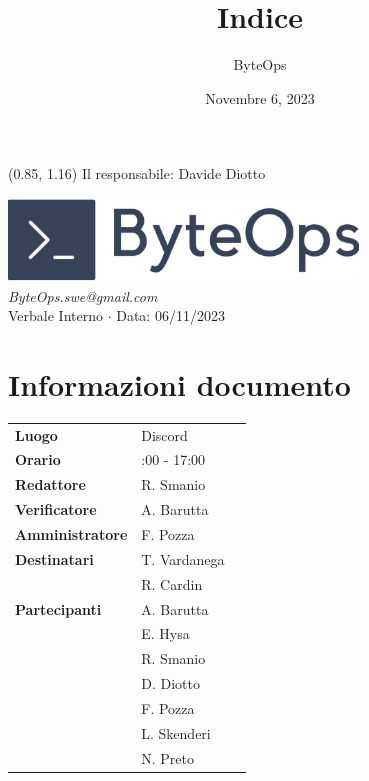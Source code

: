 \documentclass{article}
\title{\textbf{\fontsize{28}{6}\selectfont Indice}}
\author{\fontsize{14}{6}\selectfont ByteOps}
\date{Novembre 6, 2023}
\begin{document}
\begin{textblock*}{\textwidth}(0.85\textwidth, 1.16\textheight)
    Il responsabile: Davide Diotto
\end{textblock*}

\pagestyle{fancy}
\begin{center}
\includegraphics[width = 0.7\textwidth]{../../../Images/logo.png} \\
\vspace{0.2cm}
\textcolor[RGB]{60, 60, 60}{\textit{ByteOps.swe@gmail.com}} \\
\vspace{1cm}
\fontsize{16}{6}\selectfont Verbale Interno $\cdot$ Data: 06/11/2023 \\
\vspace{0.5cm}
\end{center}

\section*{Informazioni documento}
\def\arraystretch{1.2}
\begin{tabular}{>{\raggedleft\arraybackslash}p{}|>{\raggedright\arraybackslash}p{}c}
\hline
\addlinespace
\textbf{Luogo} & Discord \vspace{10pt} \\
\textbf{Orario} & 15:00 - 17:00 \vspace{10pt} \\
\textbf{Redattore} & R. Smanio \vspace{10pt} \\
\textbf{Verificatore} & A. Barutta \vspace{10pt} \\
\textbf{Amministratore} & F. Pozza \vspace{10pt} \\
\textbf{Destinatari} & T. Vardanega \\ & R. Cardin \vspace{10pt} \\
\textbf{Partecipanti} & A. Barutta \\ & E. Hysa \\ & R. Smanio \\ & D. Diotto \\ & F. Pozza \\ & L. Skenderi \\ & N. Preto \vspace{10pt} \\
\end{tabular}
\pagebreak 
\end{document}
